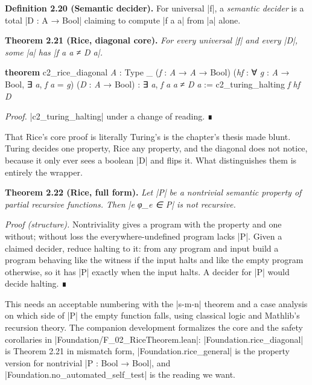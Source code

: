\documentclass{memoir}
\begin{document}
\textbf{Definition 2.20 (Semantic decider).} For universal \LeanVerb|f|, a \emph{semantic decider} is a
total \LeanVerb|D : A → Bool| claiming to compute \LeanVerb|f a a| from \LeanVerb|a| alone.

\textbf{Theorem 2.21 (Rice, diagonal core).} \emph{For every universal \LeanVerb|f| and every \LeanVerb|D|, some
\LeanVerb|a| has \LeanVerb|f a a ≠ D a|.}

\begin{LeanVerbatim}
\textbf{theorem} c2_rice_diagonal \textit{A} : Type _ (\textit{f} : \textit{A} → \textit{A} → Bool)
    (\textit{hf} : ∀ \textit{g} : \textit{A} → Bool, ∃ \textit{a}, \textit{f} \textit{a} = \textit{g}) (\textit{D} : \textit{A} → Bool) :
    ∃ \textit{a}, \textit{f} \textit{a} \textit{a} ≠ \textit{D} \textit{a} :=
  c2_turing_halting \textit{f} \textit{hf} \textit{D}

\end{LeanVerbatim}


\emph{Proof.} \LeanVerb|c2_turing_halting| under a change of reading. ∎

That Rice's core proof is literally Turing's is the chapter's thesis made blunt.
Turing decides one property, Rice any property, and the diagonal does not
notice, because it only ever sees a boolean \LeanVerb|D| and flips it. What distinguishes
them is entirely the wrapper.

\textbf{Theorem 2.22 (Rice, full form).} \emph{Let \LeanVerb|P| be a nontrivial semantic property of
partial recursive functions. Then \LeanVerb|e  φ_e ∈ P| is not recursive.}

\emph{Proof (structure).} Nontriviality gives a program with the property and one
without; without loss the everywhere-undefined program lacks \LeanVerb|P|. Given a
claimed decider, reduce halting to it: from any program and input build a
program behaving like the witness if the input halts and like the empty program
otherwise, so it has \LeanVerb|P| exactly when the input halts. A decider for \LeanVerb|P| would
decide halting. ∎

This needs an acceptable numbering with the \LeanVerb|s-m-n| theorem and a case analysis
on which side of \LeanVerb|P| the empty function falls, using classical logic and
Mathlib's recursion theory. The companion development formalizes the core and
the safety corollaries in \LeanVerb|Foundation/F_02_RiceTheorem.lean|:
\LeanVerb|Foundation.rice_diagonal| is Theorem 2.21 in mismatch form,
\LeanVerb|Foundation.rice_general| is the property version for nontrivial \LeanVerb|P : Bool → Bool|,
and \LeanVerb|Foundation.no_automated_self_test| is the reading we want.
\end{document}
